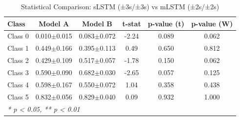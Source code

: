 \begin{table}[htbp]
\centering
\caption{Statistical Comparison: sLSTM (±3s/±3s) vs mLSTM (±2s/±2s)}
\label{tab:comparison_class_slstm_±3s_±3s_vs_mlstm_±2s_±2s}
\begin{tabular}{lccccc}
\toprule
\textbf{Class} & \textbf{Model A} & \textbf{Model B} & \textbf{t-stat} & \textbf{p-value (t)} & \textbf{p-value (W)} \\
\midrule
Class 0 & 0.010$\pm$0.015 & 0.083$\pm$0.072 & -2.24 & 0.089 & 0.062 \\
Class 1 & 0.449$\pm$0.166 & 0.395$\pm$0.113 & 0.49 & 0.650 & 0.812 \\
Class 2 & 0.429$\pm$0.109 & 0.517$\pm$0.057 & -1.78 & 0.150 & 0.062 \\
Class 3 & 0.590$\pm$0.090 & 0.682$\pm$0.030 & -2.65 & 0.057 & 0.125 \\
Class 4 & 0.598$\pm$0.167 & 0.550$\pm$0.072 & 1.04 & 0.358 & 0.438 \\
Class 5 & 0.832$\pm$0.056 & 0.829$\pm$0.040 & 0.09 & 0.932 & 1.000 \\
\bottomrule
\multicolumn{6}{l}{\textit{* p < 0.05, ** p < 0.01}} \\
\end{tabular}
\end{table}